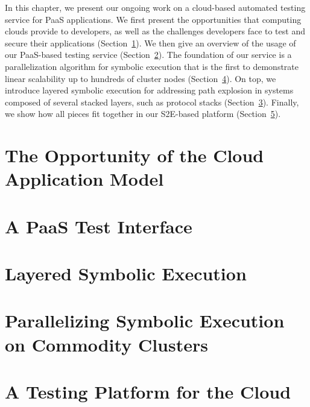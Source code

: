 In this chapter, we present our ongoing work on a cloud-based automated testing service for PaaS applications.
%
We first present the opportunities that computing clouds provide to developers, as well as the challenges developers face to test and secure their applications (Section~\ref{sec:paas:opportunity}).
%
We then give an overview of the usage of our PaaS-based testing service (Section~\ref{sec:paas:abstractions}).
%
The foundation of our service is a parallelization algorithm for symbolic execution that is the first to demonstrate linear scalability up to hundreds of cluster nodes (Section~\ref{sec:paas:parsymbex}).
%
On top, we introduce layered symbolic execution for addressing path explosion in systems composed of several stacked layers, such as protocol stacks (Section~\ref{sec:paas:layeredsymbex}).
%
Finally, we show how all pieces fit together in our S2E-based platform (Section~\ref{sec:paas:fedsymbex}).

\section{The Opportunity of the Cloud Application Model}
\label{sec:paas:opportunity}


\section{A PaaS Test Interface}
\label{sec:paas:abstractions}


\section{Layered Symbolic Execution}
\label{sec:paas:layeredsymbex}


\section{Parallelizing Symbolic Execution on Commodity Clusters}
\label{sec:paas:parsymbex}


\section{A Testing Platform for the Cloud}
\label{sec:paas:fedsymbex}





